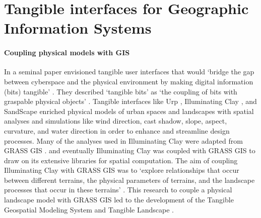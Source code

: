 \documentclass{article}
\begin{document}

\section{Tangible interfaces for Geographic Information Systems}



\paragraph{Coupling physical models with GIS}

In a seminal paper \citeauthor{Ishii1997} envisioned tangible user interfaces that would 
`bridge the gap between cyberspace and the physical environment by making digital information (bits) tangible' \citeyearpar{Ishii1997}.
They described `tangible bits' as `the coupling of bits with graspable physical objects' \citep{Ishii1997}. 
%
Tangible interfaces like 
Urp \citep{Underkoffler1999}, Illuminating Clay \citep{Piper2002a}, and SandScape \citep{Ratti2004} 
enriched physical models of urban spaces and landscapes with spatial analyses and simulations 
like wind direction, cast shadow, slope, aspect, curvature, and water direction
in order to enhance and streamline design processes. 
%
Many of the analyses used in Illuminating Clay were adapted from GRASS GIS \citep{Piper2002a}. 
and eventually 
Illuminating Clay was coupled with GRASS GIS 
to draw on its extensive libraries for spatial computation. 
The aim of coupling Illuminating Clay with GRASS GIS was to 
`explore relationships that occur between different terrains, the physical parameters of terrains, and the landscape processes that occur in these terrains' \citep{Mitasova2006}. 
%
This research to couple a physical landscape model with GRASS GIS led to the development of 
the Tangible Geospatial Modeling System \citep{Tateosian2010} and Tangible Landscape \citep{Petrasova2014,Petrasova2015}.
\end{document}
